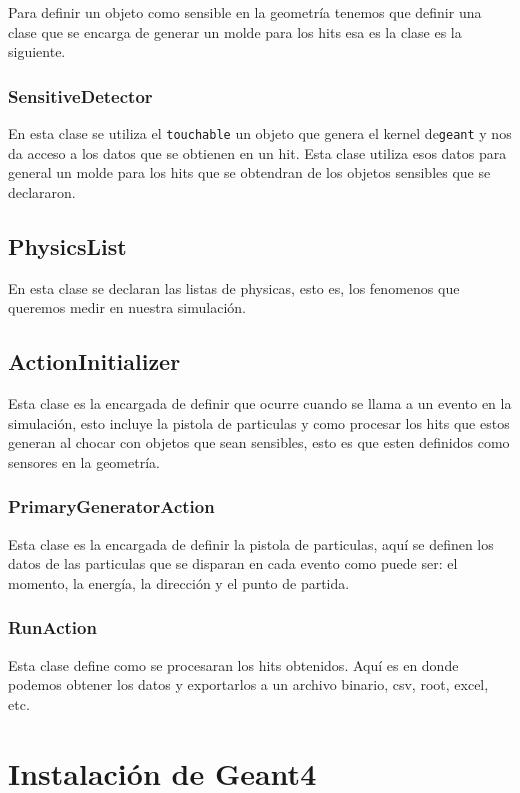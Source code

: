 \documentclass[a4paper,10pt]{article}
\begin{document}
		Para definir un objeto como sensible en la geometría tenemos que definir una clase que se encarga de generar un molde para los hits esa es la clase es la siguiente.

		\subsubsection{SensitiveDetector}

			En esta clase se utiliza el \verb|touchable| un objeto que genera el kernel de\verb|geant| y nos da acceso a los datos que se obtienen en un hit. Esta clase utiliza esos datos para general un molde para los hits que se obtendran de los objetos sensibles que se declararon.

	\subsection{PhysicsList}

		En esta clase se declaran las listas de physicas, esto es, los fenomenos que queremos medir en nuestra simulación.

	\subsection{ActionInitializer}
		
		Esta clase es la encargada de definir que ocurre cuando se llama a un evento en la simulación, esto incluye la pistola de particulas y como procesar los hits que estos generan al chocar con objetos que sean sensibles, esto es que esten definidos como sensores en la geometría.

		\subsubsection{PrimaryGeneratorAction}
			
			Esta clase es la encargada de definir la pistola de particulas, aquí se definen los datos de las particulas que se disparan en cada evento como puede ser: el momento, la energía, la dirección y el punto de partida.

		\subsubsection{RunAction}

			Esta clase define como se procesaran los hits obtenidos. Aquí es en donde podemos obtener los datos y exportarlos a un archivo binario, csv, root, excel, etc.

    \appendix
        \section{Instalación de Geant4}
\end{document}
